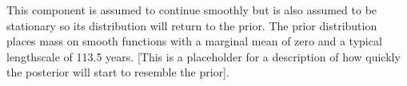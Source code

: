 This component is assumed to continue smoothly but is also assumed to be stationary so its distribution will return to the prior.
The prior distribution places mass on smooth functions with a marginal mean of zero and a typical lengthscale of 113.5 years.
[This is a placeholder for a description of how quickly the posterior will start to resemble the prior].